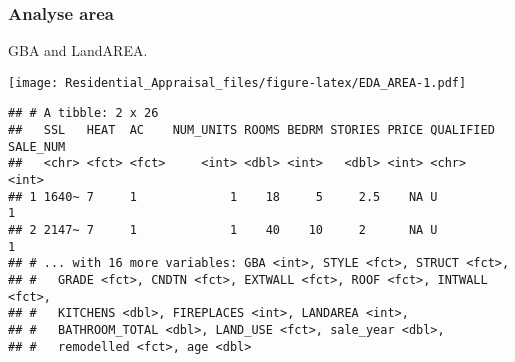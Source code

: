 \documentclass[]{article}
\newenvironment{Shaded}{\begin{snugshade}}{\end{snugshade}}
\newcommand{\CommentTok}[1]{\textcolor[rgb]{0.56,0.35,0.01}{\textit{#1}}}
\newcommand{\DataTypeTok}[1]{\textcolor[rgb]{0.13,0.29,0.53}{#1}}
\newcommand{\DecValTok}[1]{\textcolor[rgb]{0.00,0.00,0.81}{#1}}
\newcommand{\KeywordTok}[1]{\textcolor[rgb]{0.13,0.29,0.53}{\textbf{#1}}}
\newcommand{\NormalTok}[1]{#1}
\newcommand{\OperatorTok}[1]{\textcolor[rgb]{0.81,0.36,0.00}{\textbf{#1}}}
\newcommand{\StringTok}[1]{\textcolor[rgb]{0.31,0.60,0.02}{#1}}
\begin{document}
\hypertarget{analyse-area}{%
\subsubsection{Analyse area}\label{analyse-area}}

GBA and LandAREA.

\begin{Shaded}
\end{Shaded}

\texttt{[image: Residential\_Appraisal\_files/figure-latex/EDA\_AREA-1.pdf]}

\begin{Shaded}
\end{Shaded}

\begin{verbatim}
## # A tibble: 2 x 26
##   SSL   HEAT  AC    NUM_UNITS ROOMS BEDRM STORIES PRICE QUALIFIED SALE_NUM
##   <chr> <fct> <fct>     <int> <dbl> <int>   <dbl> <int> <chr>        <int>
## 1 1640~ 7     1             1    18     5     2.5    NA U                1
## 2 2147~ 7     1             1    40    10     2      NA U                1
## # ... with 16 more variables: GBA <int>, STYLE <fct>, STRUCT <fct>,
## #   GRADE <fct>, CNDTN <fct>, EXTWALL <fct>, ROOF <fct>, INTWALL <fct>,
## #   KITCHENS <dbl>, FIREPLACES <int>, LANDAREA <int>,
## #   BATHROOM_TOTAL <dbl>, LAND_USE <fct>, sale_year <dbl>,
## #   remodelled <fct>, age <dbl>
\end{verbatim}

\begin{Shaded}
\end{Shaded}
\end{document}
